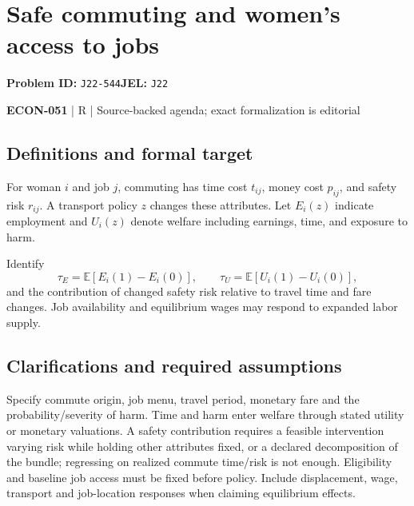 \documentclass[11pt,a4paper]{article}
\begin{document}
\section*{Safe commuting and women’s access to jobs}
\textbf{Problem ID:} \texttt{J22-544}\quad \textbf{JEL:} \texttt{J22}\par
\label{problem:OP-0621}


\label{audited:ECON-051}

{\sffamily\small\color{muted}\textbf{ECON-051} | R | Source-backed agenda; exact formalization is editorial\par}

\subsection*{Definitions and formal target}

For woman $i$ and job $j$, commuting has time cost $t_{ij}$, money cost $p_{ij}$, and safety risk $r_{ij}$. A transport policy $z$ changes these attributes. Let $E_i(z)$ indicate employment and $U_i(z)$ denote welfare including earnings, time, and exposure to harm.

Identify
\[
 \tau_E=\mathbb E[E_i(1)-E_i(0)],\qquad
 \tau_U=\mathbb E[U_i(1)-U_i(0)],
\]
and the contribution of changed safety risk relative to travel time and fare changes. Job availability and equilibrium wages may respond to expanded labor supply.

\subsection*{Clarifications and required assumptions}

Specify commute origin, job menu, travel period, monetary fare and the probability/severity of harm. Time and harm enter welfare through stated utility or monetary valuations. A safety contribution requires a feasible intervention varying risk while holding other attributes fixed, or a declared decomposition of the bundle; regressing on realized commute time/risk is not enough. Eligibility and baseline job access must be fixed before policy. Include displacement, wage, transport and job-location responses when claiming equilibrium effects.
\end{document}
